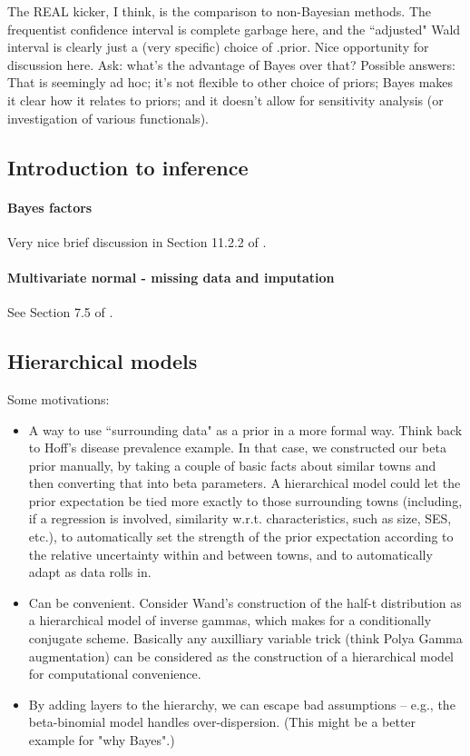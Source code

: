 \documentclass{article} %
\begin{document}
The REAL kicker,  I think,  is the comparison to non-Bayesian methods.  The frequentist confidence interval is complete garbage here,  and the ``adjusted" Wald interval is clearly just a (very specific) choice of .prior.   Nice opportunity for discussion here.  Ask:  what's the advantage of Bayes over that?  Possible answers: That is seemingly ad hoc; it's not flexible to other choice of priors; Bayes makes it clear how it relates to priors; and it doesn't allow for sensitivity analysis (or investigation of various functionals).  



\subsection{Introduction to inference}

\paragraph{Bayes factors}

Very nice brief discussion in Section 11.2.2 of \cite{davison2003statistical}. 

\paragraph{Multivariate normal - missing data and imputation}

See Section 7.5 of \cite{hoff2009first}.

\subsection{Hierarchical models}

Some motivations:  
\begin{itemize}
\item A way to use ``surrounding data" as a prior in a more formal way.    Think back to Hoff's disease prevalence example.    In that case,  we constructed our beta prior manually,  by taking a couple of basic facts about similar towns and then converting that into beta parameters.    A hierarchical model could let the prior expectation be tied more exactly to those surrounding towns (including, if a regression is involved,  similarity w.r.t.  characteristics,  such as size,  SES,  etc.),  to automatically set the strength of the prior expectation according to the relative uncertainty within and between towns,  and to automatically adapt as data rolls in. 
\item Can be convenient.  Consider Wand's construction of the half-t distribution as a hierarchical model of inverse gammas,  which makes for a conditionally conjugate scheme.  Basically any auxilliary variable trick (think Polya Gamma augmentation) can be considered as the construction of a hierarchical model for computational convenience.  
\item By adding layers to the hierarchy,  we can escape bad assumptions -- e.g.,  the beta-binomial model handles over-dispersion.   (This might be a better example for "why Bayes".)
\end{itemize}
\end{document}
